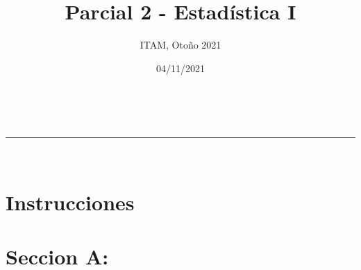\documentclass[addpoints]{exam}
\makeatletter
\newcommand{\linia}{\rule{\linewidth}{0.5pt}}
\theoremstyle{mytheor}
\renewcommand{\maketitle}{
    \begin{center}
    \vspace{2ex}
    {\huge \textsc{\@title}}
    \vspace{1ex}
    \\
    \linia\\
    \@author \hfill \@date
    \vspace{4ex}
    \end{center}
  }
\makeatother
\begin{document}
  
  \title{Parcial 2 - Estadística I}
  
  \author{ITAM, Otoño 2021}
  
  \date{04/11/2021}
  
  \maketitle
  
  \section*{Instrucciones}
\vspace{10pt}

  \section*{Seccion A: }
  
\end{document}
